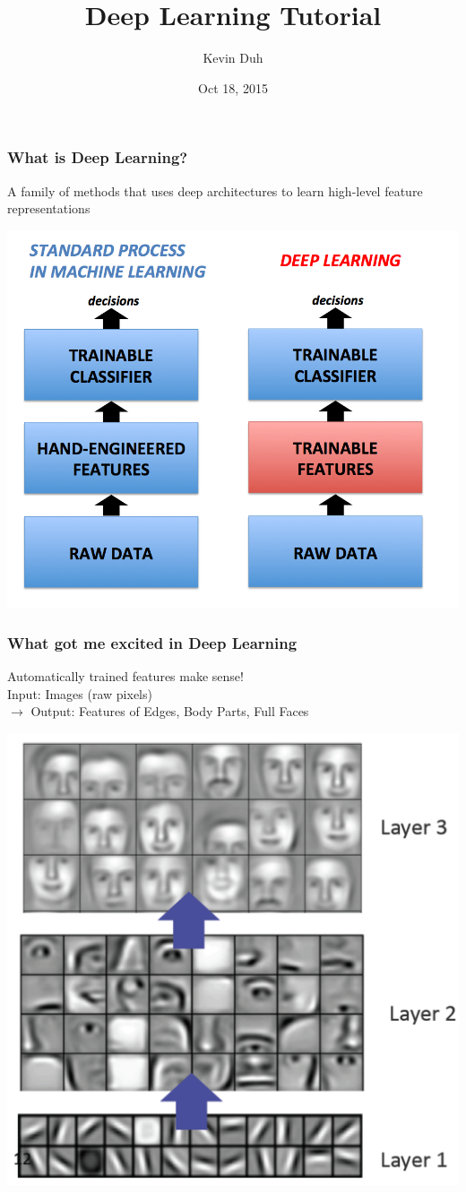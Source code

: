 \documentclass{beamer}
\title{Deep Learning Tutorial}
\author{Kevin Duh}
\institute{Nara Institute of Science \& Technology / Johns Hopkins HLTCOE}
\date{Oct 18, 2015}
\begin{document}
\begin{frame}
\titlepage
\end{frame}


\begin{frame}
\frametitle{What is Deep Learning?}
A family of methods that uses deep architectures to learn high-level feature representations
\centerline{\includegraphics[scale=0.27]{figs/deep_vs_conventional_learning}}
\end{frame}

\begin{frame}
\frametitle{What got me excited in Deep Learning}
Automatically trained features make sense! \cite{lee09convolutional}\\[0.2cm]
Input: Images (raw pixels)\\
$\rightarrow$ Output: Features of Edges, Body Parts, Full Faces

\centerline{\includegraphics[scale=0.35]{figs/lee09example}}
\end{frame}
\end{document}
